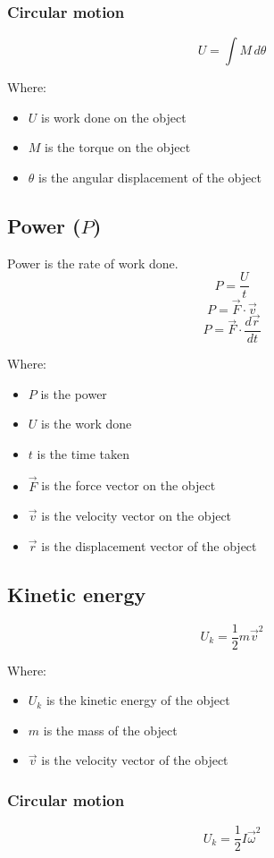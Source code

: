 \documentclass[11pt]{article}
\begin{document}
\subsubsection{Circular motion}
\label{sec:org0e450f0}
\[U = \int M \, d \theta\]

Where:
\begin{itemize}
\item \(U\) is work done on the object
\item \(M\) is the torque on the object
\item \(\theta\) is the angular displacement of the object
\end{itemize}

 \newpage
\subsection{Power (\(P\))}
\label{sec:orgb9b8978}
Power is the rate of work done.
\[P = \frac{U}{t}\]
\[P = \vec{F} \cdot \vec{v}\]
\[P = \vec{F} \cdot \frac{d \vec{r}}{dt}\]

Where:
\begin{itemize}
\item \(P\) is the power
\item \(U\) is the work done
\item \(t\) is the time taken
\item \(\vec{F}\) is the force vector on the object
\item \(\vec{v}\) is the velocity vector on the object
\item \(\vec{r}\) is the displacement vector of the object
\end{itemize}
\subsection{Kinetic energy}
\label{sec:org2b3dc57}
\[U_k = \frac{1}{2} m \vec{v}^2\]

Where:
\begin{itemize}
\item \(U_k\) is the kinetic energy of the object
\item \(m\) is the mass of the object
\item \(\vec{v}\) is the velocity vector of the object
\end{itemize}
\subsubsection{Circular motion}
\label{sec:org6376e3e}
\[U_k = \frac{1}{2} I \vec{\omega}^2\]
\end{document}
